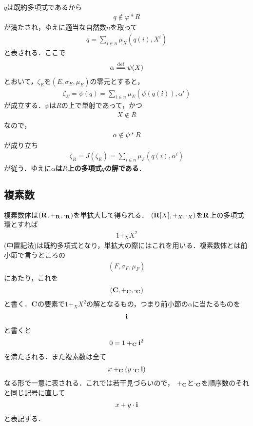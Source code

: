 	$q$は既約多項式であるから
	\begin{align}
		q \notin \varphi \ast R
	\end{align}
	が満たされ，ゆえに適当な自然数$n$を取って
	\begin{align}
		q = \sum_{i \in n} \mu_X \left(q(i),X^i\right)
	\end{align}
	と表される．ここで
	\begin{align}
		\alpha \defeq \psi(X)
	\end{align}
	とおいて，$\zeta_E$を$(E,\sigma_E,\mu_E)$の零元とすると，
	\begin{align}
		\zeta_E = \psi(q)
		= \sum_{i \in n} \mu_E \left(\psi(q(i)),\alpha^i\right)
	\end{align}
	が成立する．$\psi$は$R$の上で単射であって，かつ
	\begin{align}
		X \notin R
	\end{align}
	なので，
	\begin{align}
		\alpha \notin \psi \ast R
	\end{align}
	が成り立ち
	\begin{align}
		\zeta_R = J(\zeta_E)
		= \sum_{i \in n} \mu_F \left(q(i),\alpha^i\right)
	\end{align}
	が従う．ゆえに{\bf $\alpha$は$R$上の多項式$q$の解である}．
	
	
\subsection{複素数}
	複素数体は$(\mathbf{R},+_{\mathbf{R}},\cdot_{\mathbf{R}})$を単拡大して得られる．
	$(\mathbf{R}[X],+_X,\cdot_X)$を$\mathbf{R}$上の多項式環とすれば
	\begin{align}
		1 +_X X^2
	\end{align}
	(中置記法)は既約多項式となり，単拡大の際にはこれを用いる．複素数体とは前小節で言うところの
	\begin{align}
		(F,\sigma_F,\mu_F)
	\end{align}
	にあたり，これを
	\begin{align}
		(\mathbf{C},+_{\mathbf{C}},\cdot_{\mathbf{C}})
	\end{align}
	と書く．$\mathbf{C}$の要素で$1 +_X X^2$の解となるもの，つまり前小節の$\alpha$に当たるものを
	\begin{align}
		\mathbf{i}
	\end{align}
	と書くと
	\begin{align}
		0 = 1 +_{\mathbf{C}} \mathbf{i}^2
	\end{align}
	を満たされる．また複素数は全て
	\begin{align}
		x +_{\mathbf{C}} (y \cdot_{\mathbf{C}} \mathbf{i})
	\end{align}
	なる形で一意に表される．これでは若干見づらいので，
	$+_{\mathbf{C}}$と$\cdot_{\mathbf{C}}$を順序数のそれと同じ記号に直して
	\begin{align}
		x + y \cdot \mathbf{i}
	\end{align}
	と表記する．

\newpage